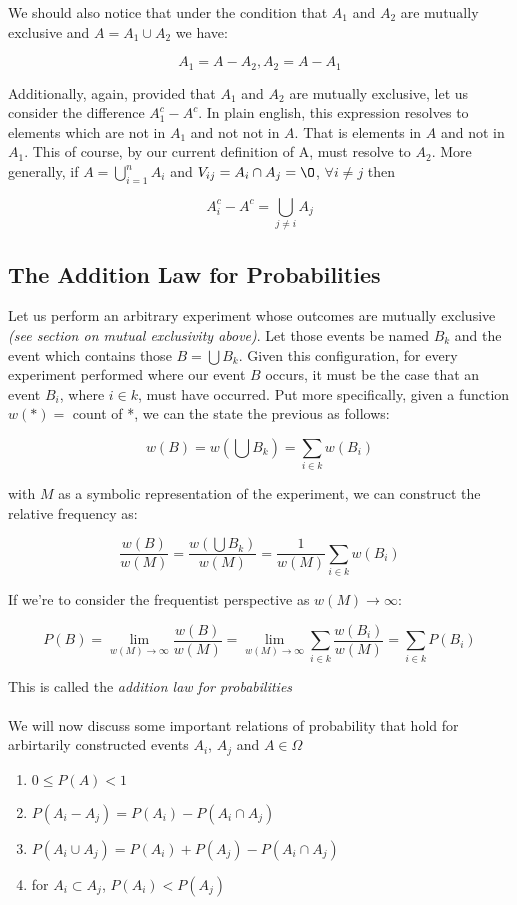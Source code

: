 \documentclass{article}
\begin{document}
We should also notice that under the condition that \(A_1\) and \(A_2\) are mutually exclusive and \(A = A_1 \cup A_2\) we have:

\[A_1 = A - A_2, A_2 = A - A_1\]

Additionally, again, provided that \(A_1\) and \(A_2\) are mutually exclusive, let us consider the difference \(A_{1}^{c} - A^c\). In plain english, this expression resolves to elements which are not in \(A_1\) and not not in \(A\). That is elements in \(A\) and not in \(A_1\). This of course, by our current definition of A, must resolve to \(A_2\). More generally, if \(A = \bigcup_{i=1}^{n}A_i\) and \(V_{ij} = A_i \cap A_j = \O\),  \(\forall i \neq j\) then

\[A_{i}^{c} - A^{c} = \bigcup_{j \neq i}A_j\]

\subsection{The Addition Law for Probabilities}

Let us perform an arbitrary experiment whose outcomes are mutually exclusive \textit{(see section on mutual exclusivity above)}. Let those events be named \(B_k\)  and the event which contains those \(B = \bigcup B_k\). Given this configuration, for every experiment performed where our event \(B\) occurs, it must be the case that an event \(B_i\), where \(i \in k\), must have occurred. Put more specifically, given a function \(w(*) =\) count of *, we can the state the previous as follows:

\[w(B) = w(\bigcup B_k) = \sum_{i \in k} w(B_i)\]

with \(M\) as a symbolic representation of the experiment, we can construct the relative frequency as:

\[\frac{w(B)}{w(M)} = \frac{w(\bigcup B_k)}{w(M)} = \frac{1}{w(M)}\sum_{i \in k} w(B_i)\]

If we're to consider the frequentist perspective as \(w(M) \to \infty\):

 \[P(B) = \lim_{w(M) \to \infty} \frac{w(B)}{w(M)} = \lim_{w(M) \to \infty}  \sum_{i \in k} \frac{w(B_i)}{w(M)} = \sum_{i \in k} P(B_i)\]

This is called the \textit{addition law for probabilities}
\\
\\
We will now discuss some important relations of probability that hold for arbirtarily constructed events \(A_i\), \(A_j\) and \(A \in \Omega\)
\begin{enumerate}
\item \(0 \leq P(A) < 1\)
\item \(P(A_i - A_j) = P(A_i) - P(A_i \cap A_j)\)
\item \(P(A_i \cup A_j) = P(A_i) + P(A_j) - P(A_i \cap A_j)\)
\item for  \(A_i \subset A_j\), \(P(A_i) < P(A_j)\)
\end{enumerate}
\end{document}
